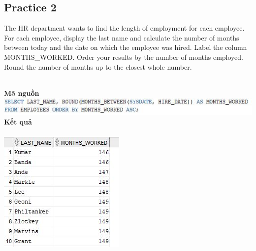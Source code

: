\documentclass[12pt,a4paper]{report}
\begin{document}
\subsection{Practice 2}
\begin{boxedminipage}[t]{15.5cm}
The HR department wants to find the length of employment for each employee. 
For each employee, display the last name and calculate the number of months between today and the date 
on which the employee was hired. Label the column MONTHS\_WORKED. Order your results by the number 
of months employed. Round the number of months up to the closest whole number.
\end{boxedminipage}
\newline
\\
\textbf{Mã nguồn}
\\
\newline
\includegraphics[scale=1]{25.jpg}\\
\textbf{Kết quả}\\\\
\includegraphics[scale=1]{k25.jpg}
\end{document}
